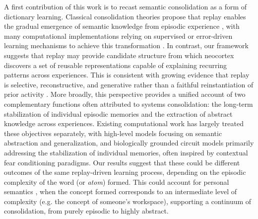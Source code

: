 \documentclass{article}
\begin{document}
A first contribution of this work is to recast semantic consolidation as a form of dictionary learning. Classical consolidation theories propose that replay enables the gradual emergence of semantic knowledge from episodic experience , with many computational implementations relying on supervised or error-driven learning mechanisms to achieve this transformation . In contrast, our framework suggests that replay may provide candidate structure from which neocortex discovers a set of reusable representations capable of explaining recurring patterns across experiences. This is consistent with growing evidence that replay is selective, reconstructive, and generative rather than a faithful reinstantiation of prior activity . More broadly, this perspective provides a unified account of two complementary functions often attributed to systems consolidation: the long-term stabilization of individual episodic memories and the extraction of abstract knowledge across experiences. Existing computational work has largely treated these objectives separately, with high-level models focusing on semantic abstraction and generalization, and biologically grounded circuit models primarily addressing the stabilization of individual memories, often inspired by contextual fear conditioning paradigms. Our results suggest that these could be different outcomes of the same replay-driven learning process, depending on the episodic complexity of the word (or \textit{atom}) formed. This could account for personal semantics , when the concept formed corresponds to an intermediate level of complexity (e.g. the concept of someone's workspace), supporting a continuum of consolidation, from purely episodic to highly abstract.
\newline\newline
\end{document}
